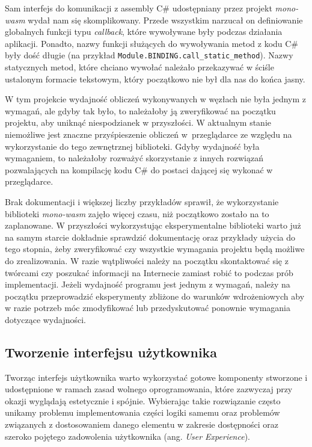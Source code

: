 \documentclass[a4paper,11pt,twoside]{report}
\theoremstyle{definition}
\begin{document}
            Sam interfejs do komunikacji z assembly C\# udostępniany przez projekt \textit{mono-wasm} wydał nam się skomplikowany. Przede wszystkim narzucał on definiowanie globalnych funkcji typu \textit{callback}, które wywoływane były podczas działania aplikacji. Ponadto, nazwy funkcji służących do wywoływania metod z kodu C\# były dość długie (na przykład \texttt{Module.BINDING.call\_static\_method}). Nazwy statycznych metod, które chciano wywołać należało przekazywać w ściśle ustalonym formacie tekstowym, który początkowo nie był dla nas do końca jasny.
            
            W tym projekcie wydajność obliczeń wykonywanych w węzłach nie była jednym z wymagań, ale gdyby tak było, to należałoby ją zweryfikować na początku projektu, aby uniknąć niespodzianek w przyszłości. W aktualnym stanie niemożliwe jest znaczne przyśpieszenie obliczeń w~przeglądarce ze względu na wykorzystanie do tego zewnętrznej biblioteki. Gdyby wydajność była wymaganiem, to należałoby rozważyć skorzystanie z innych rozwiązań pozwalających na kompilację kodu C\# do postaci dającej się wykonać w przeglądarce.
            
            Brak dokumentacji i większej liczby przykładów sprawił, że wykorzystanie biblioteki \textit{mono-wasm} zajęło więcej czasu, niż początkowo zostało na to zaplanowane.
            W przyszłości wykorzystując eksperymentalne biblioteki warto już na samym starcie dokładnie sprawdzić dokumentację oraz przykłady użycia do tego stopnia, żeby zweryfikować czy wszystkie wymagania projektu będą możliwe do zrealizowania. W razie wątpliwości należy na początku skontaktować się z twórcami czy poszukać informacji na Internecie zamiast robić to podczas prób implementacji.
            Jeżeli wydajność programu jest jednym z wymagań, należy na początku przeprowadzić eksperymenty zbliżone do warunków wdrożeniowych aby w razie potrzeb móc zmodyfikować lub przedyskutować ponownie wymagania dotyczące wydajności.
        
        \subsection{Tworzenie interfejsu użytkownika}
            Tworząc interfejs użytkownika warto wykorzystać gotowe komponenty stworzone i udostępnione w ramach zasad wolnego oprogramowania, które zazwyczaj przy okazji wyglądają estetycznie i spójnie. Wybierając takie rozwiązanie często unikamy problemu implementowania części logiki samemu oraz problemów związanych z dostosowaniem danego elementu w zakresie dostępności oraz szeroko pojętego zadowolenia użytkownika (ang. {\textit{User Experience})}.
            
\end{document}
